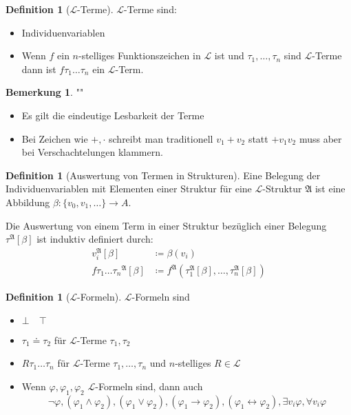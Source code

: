\documentclass[12pt,parskip=full]{scrartcl}
\theoremstyle{definition}
\newtheorem{definition}[theorem]{Definition}
\newtheorem{remark}[theorem]{Bemerkung}
\begin{document}
	\begin{definition}[$\mathcal{L}$-Terme]
		$\mathcal{L}$-Terme sind:
		\begin{itemize}
			\item Individuenvariablen
			\item Wenn $f$ ein $n$-stelliges Funktionszeichen in $\mathcal{L}$ ist und $\tau_1, \dots, \tau_n$ sind $\mathcal{L}$-Terme dann ist $f \tau_1 \dots \tau_n$ ein $\mathcal{L}$-Term.
		\end{itemize}
	\end{definition}

	\begin{remark}""
		\begin{itemize}
			\item Es gilt die eindeutige Lesbarkeit der Terme
			\item Bei Zeichen wie $+, \cdot$ schreibt man traditionell $v_1 + v_2$ statt $+ v_1 v_2$ muss aber bei Verschachtelungen klammern.
		\end{itemize}
	\end{remark}

	\begin{definition}[Auswertung von Termen in Strukturen]
		Eine Belegung der Individuenvariablen mit Elementen einer Struktur für eine $\mathcal{L}$-Struktur $\mathfrak{A}$ ist eine Abbildung $\beta: \{ v_0, v_1, \dots \} \to A$.
		
		Die Auswertung von einem Term in einer Struktur bezüglich einer Belegung $\tau^\mathfrak{A}[\beta]$ ist induktiv definiert durch:
		\begin{align*}
			v_i^\mathfrak{A}[\beta] &\coloneqq \beta(v_i) \\
			f \tau_1 \dots \tau_n {}^\mathfrak{A} [\beta] &\coloneqq f^\mathfrak{A}(\tau_1^\mathfrak{A}[\beta], \dots, \tau_n^\mathfrak{A}[\beta])
		\end{align*}
	\end{definition}

	\begin{definition}[$\mathcal{L}$-Formeln]
		$\mathcal{L}$-Formeln sind
		\begin{itemize}
			\item $\bot \quad \top$
			\item $\tau_1 \doteq \tau_2$ für $\mathcal{L}$-Terme $\tau_1, \tau_2$
			\item $R \tau_1 \dots \tau_n$ für $\mathcal{L}$-Terme $\tau_1, \dots, \tau_n$ und $n$-stelliges $R \in \mathcal{L}$
			
			\item Wenn $\varphi, \varphi_1, \varphi_2$ $\mathcal{L}$-Formeln sind, dann auch
			\begin{equation*}
				\lnot \varphi, (\varphi_1 \land \varphi_2), (\varphi_1 \lor \varphi_2), (\varphi_1 \rightarrow \varphi_2), (\varphi_1 \leftrightarrow \varphi_2), \exists v_i \varphi, \forall v_i \varphi
			\end{equation*}
		\end{itemize}
	\end{definition}
\end{document}
